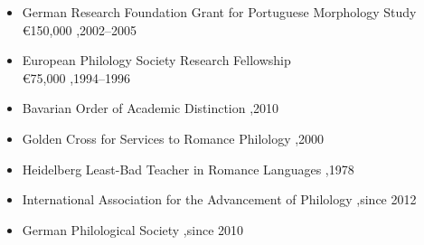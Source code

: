 \documentclass[letterpaper,10pt]{article}
\begin{document}

\begin{itemize}
\item German Research Foundation Grant for Portuguese Morphology Study\\
€150,000 \sep 2002--2005
\item European Philology Society Research Fellowship  \\
€75,000 \sep 1994--1996
\end{itemize}


\begin{itemize}
\item Bavarian Order of Academic Distinction \sep 2010
\item Golden Cross for Services to Romance Philology \sep 2000
\item Heidelberg Least-Bad Teacher in Romance Languages \sep 1978
\end{itemize}


\begin{itemize}
\item International Association for the Advancement of Philology \sep since 2012
\item German Philological Society \sep since 2010
\end{itemize}
\end{document}
